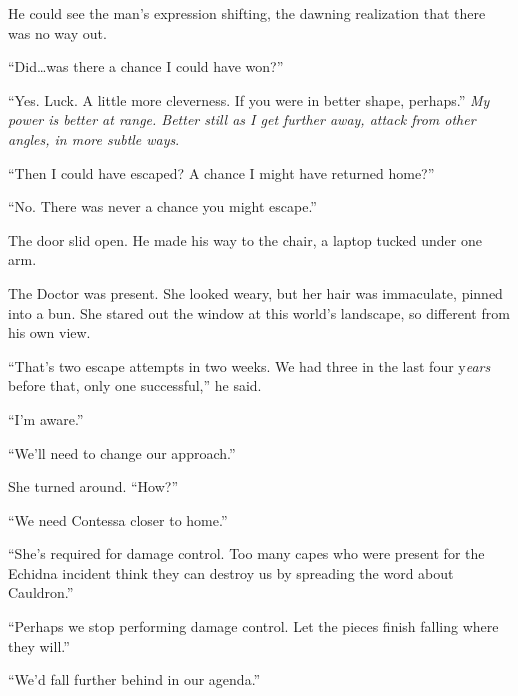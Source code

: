 He could see the man's expression shifting, the dawning realization that there was no way out.



``Did\ldots was there a chance I could have won?''



``Yes.  Luck.  A little more cleverness.  If you were in better shape, perhaps.''  \emph{My power is better at range.  Better still as I get further away, attack from other angles, in more subtle ways}.



``Then I could have escaped?  A chance I might have returned home?''



``No.  There was never a chance you might escape.''



\blacksquare



The door slid open.  He made his way to the chair, a  laptop tucked under one arm.



The Doctor was present.  She looked weary, but her hair was immaculate, pinned into a bun.  She stared out the window at this world's landscape, so different from his own view.



``That's two escape attempts in two weeks.  We had three in the last four y\emph{ears} before that, only one successful,'' he said.



``I'm aware.''



``We'll need to change our approach.''



She turned around.  ``How?''



``We need Contessa closer to home.''



``She's required for damage control.  Too many capes who were present for the Echidna incident think they can destroy us by spreading the word about Cauldron.''



``Perhaps we stop performing damage control.  Let the pieces finish falling where they will.''



``We'd fall further behind in our agenda.''



